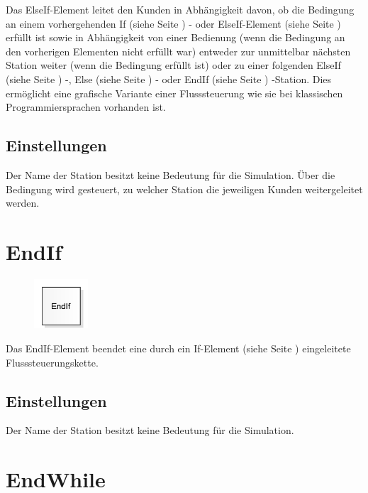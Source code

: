 Das ElseIf-Element leitet den Kunden in Abhängigkeit davon, ob die Bedingung
an einem vorhergehenden If (siehe Seite \pageref{ref:ModelElementLogicIf}) - oder
ElseIf-Element (siehe Seite \pageref{ref:ModelElementLogicElseIf}) erfüllt ist
sowie in Abhängigkeit von einer Bedienung (wenn die Bedingung an den vorherigen
Elementen nicht erfüllt war) entweder zur unmittelbar nächsten Station weiter
(wenn die Bedingung erfüllt ist) oder zu einer folgenden
ElseIf (siehe Seite \pageref{ref:ModelElementLogicElseIf}) -,
Else (siehe Seite \pageref{ref:ModelElementLogicElse}) - oder
EndIf (siehe Seite \pageref{ref:ModelElementLogicEndIf}) -Station.
Dies ermöglicht eine grafische Variante einer Flusssteuerung wie sie bei
klassischen Programmiersprachen vorhanden ist.

\subsection*{Einstellungen}

Der Name der Station besitzt keine Bedeutung für die Simulation. Über die Bedingung
wird gesteuert, zu welcher Station die jeweiligen Kunden weitergeleitet werden.


\section{EndIf}
\label{ref:ModelElementLogicEndIf}

\begin{figure}
\vspace{-22pt}
\includegraphics[width=2cm]{imageModelElementLogicEndIf.png}
\vspace{-22pt}
\end{figure}

Das EndIf-Element beendet eine durch ein
If-Element (siehe Seite \pageref{ref:ModelElementLogicEndIf}) eingeleitete
Flusssteuerungskette.

\subsection*{Einstellungen}

Der Name der Station besitzt keine Bedeutung für die Simulation.


\section{EndWhile}
\label{ref:ModelElementLogicEndWhile}

